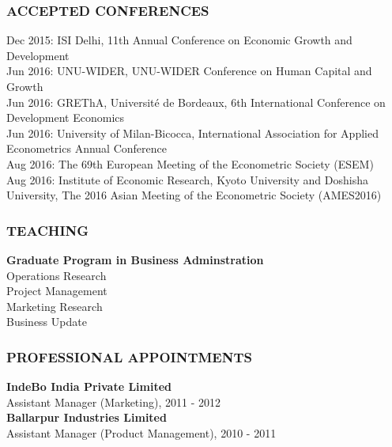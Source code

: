 \documentclass[12pt, a4paper]{article}
\begin{document}
	\subsubsection*{ACCEPTED CONFERENCES} 
Dec 2015: ISI Delhi, 11th Annual Conference on Economic Growth and Development \\ 
Jun 2016: UNU-WIDER, UNU-WIDER Conference on Human Capital and Growth \\
Jun 2016: GREThA, Universit\'{e} de Bordeaux, 6th International Conference on Development Economics \\	
Jun 2016: University of Milan-Bicocca, International Association for Applied Econometrics Annual Conference \\
Aug 2016: The 69th European Meeting of the Econometric Society (ESEM) \\
Aug 2016: Institute of Economic Research, Kyoto University and Doshisha University, The 2016 Asian Meeting of the Econometric Society (AMES2016) 
	\subsubsection*{TEACHING}
	\noindent\textbf{Graduate Program in Business Adminstration} \\
		Operations Research \\
		Project Management \\
		Marketing Research \\
		Business Update 

	\subsubsection*{PROFESSIONAL APPOINTMENTS}
	\noindent\textbf{IndeBo India Private Limited} \\
	Assistant Manager (Marketing), 2011 - 2012 \\
	
	\noindent\textbf{Ballarpur Industries Limited} \\
	Assistant Manager (Product Management), 2010 - 2011
\end{document}
